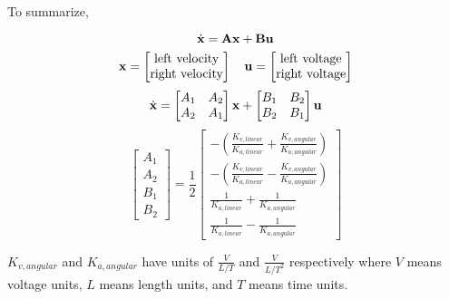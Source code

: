 To summarize,
\begin{theorem}
  \begin{equation*}
    \dot{\mathbf{x}} = \mathbf{A}\mathbf{x} + \mathbf{B}\mathbf{u}
  \end{equation*}
  \begin{equation*}
    \mathbf{x} =
    \begin{bmatrix}
      \text{left velocity} \\
      \text{right velocity}
    \end{bmatrix}
    \quad
    \mathbf{u} =
    \begin{bmatrix}
      \text{left voltage} \\
      \text{right voltage}
    \end{bmatrix}
  \end{equation*}
  \begin{equation*}
    \dot{\mathbf{x}} =
    \begin{bmatrix}
      A_1 & A_2 \\
      A_2 & A_1
    \end{bmatrix} \mathbf{x} +
    \begin{bmatrix}
      B_1 & B_2 \\
      B_2 & B_1
    \end{bmatrix} \mathbf{u}
  \end{equation*}
  \begin{equation}
    \begin{bmatrix}
      A_1 \\
      A_2 \\
      B_1 \\
      B_2
    \end{bmatrix} = \frac{1}{2}
    \begin{bmatrix}
      -\left(\frac{K_{v,linear}}{K_{a,linear}} +
        \frac{K_{v,angular}}{K_{a,angular}}\right) \\
      -\left(\frac{K_{v,linear}}{K_{a,linear}} -
        \frac{K_{v,angular}}{K_{a,angular}}\right) \\
      \frac{1}{K_{a,linear}} + \frac{1}{K_{a,angular}} \\
      \frac{1}{K_{a,linear}} - \frac{1}{K_{a,angular}}
    \end{bmatrix}
  \end{equation}

  $K_{v,angular}$ and $K_{a,angular}$ have units of $\frac{V}{L/T}$ and
  $\frac{V}{L/T^2}$ respectively where $V$ means voltage units, $L$ means length
  units, and $T$ means time units.
\end{theorem}

